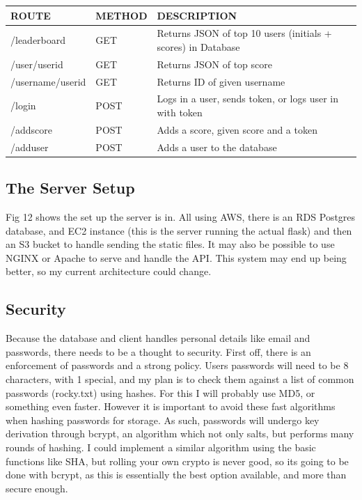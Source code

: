 \documentclass{article}
\begin{document}
\begin{table}[h!]
\begin{tabular}{|l|l|l|}
\hline
\rowcolor[HTML]{C0C0C0} 
ROUTE            & METHOD & DESCRIPTION                                                  \\ \hline
/leaderboard     & GET    & Returns JSON of top 10 users (initials + scores) in Database \\ \hline
/user/userid     & GET    & Returns JSON of top score                                    \\ \hline
/username/userid & GET    & Returns ID of given username                                 \\ \hline
/login           & POST   & Logs in a user, sends token, or logs user in with token      \\ \hline
/addscore        & POST   & Adds a score, given score and a token                        \\ \hline
/adduser         & POST   & Adds a user to the database                                  \\ \hline
\end{tabular}
\end{table}


\subsection{The Server Setup}
Fig 12 shows the set up the server is in. All using AWS, there is an RDS Postgres database, and EC2 instance (this is the server running the actual flask) and then an S3 bucket to handle sending the static files. It may also be possible to use NGINX or Apache to serve and handle the API. This system may end up being better, so my current architecture could change. 

\subsection{Security}
Because the database and client handles personal details like email and passwords, there needs to be a thought to security. First off, there is an enforcement of passwords and a strong policy. Users passwords will need to be 8 characters, with 1 special, and my plan is to check them against a list of common passwords (rocky.txt) using hashes. For this I will probably use MD5, or something even faster. However it is important to avoid these fast algorithms when hashing passwords for storage. As such, passwords will undergo key derivation through bcrypt, an algorithm which not only salts, but performs many rounds of hashing. I could implement a similar algorithm using the basic functions like SHA, but rolling your own crypto is never good, so its going to be done with bcrypt, as this is essentially the best option available, and more than secure enough.
\end{document}
